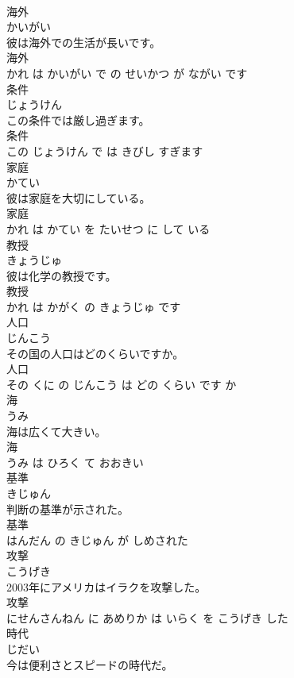 \documentclass[8pt]{extreport}
\begin{document}
\begin{CJK}{UTF8}{min}
\\	海外	
\\	かいがい			
\\	彼は海外での生活が長いです。	
\\	海外 
\\	かれ は かいがい で の せいかつ が ながい です			
\\	条件	
\\	じょうけん			
\\	この条件では厳し過ぎます。	
\\	条件 
\\	この じょうけん で は きびし すぎます			
\\	家庭	
\\	かてい			
\\	彼は家庭を大切にしている。	
\\	家庭 
\\	かれ は かてい を たいせつ に して いる			
\\	教授	
\\	きょうじゅ			
\\	彼は化学の教授です。	
\\	教授 
\\	かれ は かがく の きょうじゅ です			
\\	人口	
\\	じんこう			
\\	その国の人口はどのくらいですか。	
\\	人口 
\\	その くに の じんこう は どの くらい です か			
\\	海	
\\	うみ			
\\	海は広くて大きい。	
\\	海 
\\	うみ は ひろく て おおきい			
\\	基準	
\\	きじゅん			
\\	判断の基準が示された。	
\\	基準 
\\	はんだん の きじゅん が しめされた			
\\	攻撃	
\\	こうげき			
\\	2003年にアメリカはイラクを攻撃した。	
\\	攻撃 
\\	にせんさんねん に あめりか は いらく を こうげき した			
\\	時代	
\\	じだい			
\\	今は便利さとスピードの時代だ。	

\end{CJK}
\end{document}
